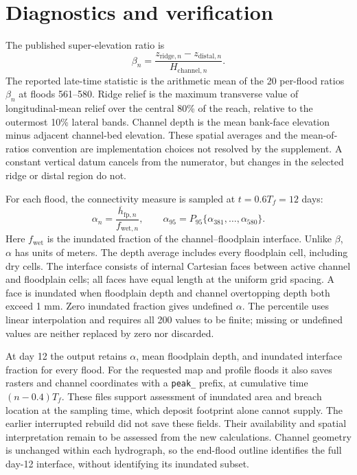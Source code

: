 \documentclass[11pt]{article}
\begin{document}
\section{Diagnostics and verification}
The published super-elevation ratio is
\begin{equation}
 \beta_n=\frac{z_{\mathrm{ridge},n}-z_{\mathrm{distal},n}}
                  {H_{\mathrm{channel},n}}.
\end{equation}
The reported late-time statistic is the arithmetic mean of the 20
per-flood ratios $\beta_n$ at floods 561--580. Ridge relief is the maximum
transverse value of longitudinal-mean relief over the central 80\% of the
reach, relative to the outermost 10\% lateral bands. Channel depth is the
mean bank-face elevation minus adjacent channel-bed elevation. These
spatial averages and the mean-of-ratios convention are implementation
choices not resolved by the supplement. A constant vertical datum cancels
from the numerator, but changes in the selected ridge or distal region do
not.

For each flood, the connectivity measure is sampled at $t=0.6T_f=12$ days:
\begin{equation}
 \alpha_n=\frac{\overline{h}_{\mathrm{fp},n}}
                         {f_{\mathrm{wet},n}},\qquad
 \alpha_{95}=P_{95}\{\alpha_{381},\ldots,\alpha_{580}\}.
 \label{eq:alpha}
\end{equation}
Here $f_{\mathrm{wet}}$ is the inundated fraction of the channel--floodplain
interface. Unlike $\beta$, $\alpha$ has units of meters. The depth average
includes every floodplain cell, including dry cells. The interface consists
of internal Cartesian faces between active channel and floodplain cells;
all faces have equal length at the uniform grid spacing. A face is
inundated when floodplain depth and channel overtopping depth both exceed
1 mm. Zero inundated fraction gives undefined $\alpha$. The percentile
uses linear interpolation and requires all 200 values to be finite;
missing or undefined values are neither replaced by zero nor discarded.

At day 12 the output retains $\alpha$, mean floodplain depth, and
inundated interface fraction for every flood. For the requested map and
profile floods it also saves rasters and channel coordinates with a
\texttt{peak\_} prefix, at cumulative time $(n-0.4)T_f$. These files
support assessment of inundated area and breach location at the sampling
time, which deposit footprint alone cannot supply. The earlier interrupted
rebuild did not save these fields. Their availability and spatial
interpretation remain to be assessed from the new calculations. Channel
geometry is unchanged within each hydrograph, so the end-flood outline
identifies the full day-12 interface, without identifying its inundated
subset.
\end{document}
